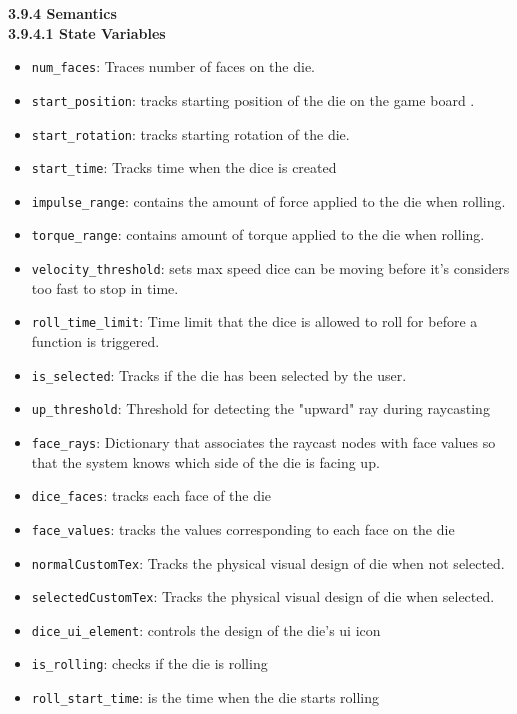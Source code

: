 \documentclass[12pt, titlepage]{article}
\begin{document}
\noindent \textbf{3.9.4 Semantics}\\
\textbf{3.9.4.1 State Variables}\\
\begin{itemize}
	\item \texttt{num\_faces}: Traces number of faces on the die.
	\item \texttt{start\_position}: tracks starting position of the die on the game board .
	\item \texttt{start\_rotation}: tracks starting rotation of the die.
	\item \texttt{start\_time}: Tracks time when the dice is created
	\item \texttt{impulse\_range}: contains the amount of force applied to the die when rolling.
	\item \texttt{torque\_range}: contains amount of torque applied to the die when rolling.
	\item \texttt{velocity\_threshold}: sets max speed dice can be moving before it's considers too fast to stop in time.
	\item \texttt{roll\_time\_limit}: Time limit that the dice is allowed to roll for before a function is triggered.
	\item \texttt{is\_selected}: Tracks if the die has been selected by the user.
	\item \texttt{up\_threshold}: Threshold for detecting the "upward" ray during raycasting
	\item \texttt{face\_rays}: Dictionary that associates the raycast nodes with face values so that the system knows which side of the die is facing up.
	\item \texttt{dice\_faces}: tracks each face of the die
	\item \texttt{face\_values}: tracks the values corresponding to each face on the die
	\item \texttt{normalCustomTex}: Tracks the physical visual design of die when not selected.
	\item \texttt{selectedCustomTex}: Tracks the physical visual design of die when selected.
	\item \texttt{dice\_ui\_element}: controls the design of the die's ui icon

	\item \texttt{is\_rolling}: checks if the die is rolling

	\item \texttt{roll\_start\_time}: is the time when the die starts rolling
\end{itemize}
\end{document}
